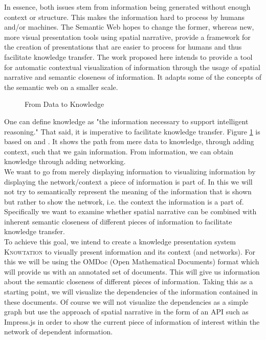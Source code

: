 \documentclass[twoside]{article}
\newcommand{\sys}{\textsc{Knowtation}\xspace}
\begin{document}
In essence, both issues stem from information being generated without enough context or structure. This makes the information hard to process by humans and/or machines. The Semantic Web hopes to change the former, whereas new, more visual presentation tools using spatial narrative, provide a framework for the creation of presentations that are easier to process for humans and thus facilitate knowledge transfer. The work proposed here intends to provide a tool for automatic contextual visualization of information through the usage of spatial narrative and semantic closeness of information. It adapts some of the concepts of the semantic web on a smaller scale.\\

\begin{figure}[H]
        \centering
                \caption{From Data to Knowledge}
                \label{fig:dataknow}
\end{figure}

One can define knowledge as "the information necessary to support intelligent reasoning." \cite{Kohlhase:Complog:base} That said, it is imperative to facilitate knowledge transfer. Figure \ref{fig:dataknow} is based on \cite{ProbstRaubRomhardt} and \cite{Kohlhase:Complog:base}. It shows the path from mere data to knowledge, through adding context, such that we gain information. From information, we can obtain knowledge through adding networking.\\

We want to go from merely displaying information to visualizing information by displaying the network/context a piece of information is part of. In this we will not try to semantically represent the meaning of the information that is shown but rather to show the network, i.e. the context the information is a part of. Specifically we want to examine whether spatial narrative can be combined with inherent semantic closeness of different pieces of information to facilitate knowledge transfer.\\

To achieve this goal, we intend to create a knowledge presentation system \sys to visually present information and its context (and networks). For this we will be using the OMDoc (Open Mathematical Documents) format which will provide us with an annotated set of documents. This will give us information about the semantic closeness of different pieces of information. Taking this as a starting point, we will visualize the dependencies of the information contained in these documents. Of course we will not visualize the dependencies as a simple graph but use the approach of spatial narrative in the form of an API such as Impress.js in order to show the current piece of information of interest within the network of dependent information.\\
\end{document}
